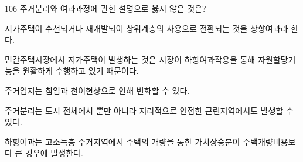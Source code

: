 \begin{question}{106}
주거분리와 여과과정에 관한 설명으로 옳지 않은 것은?
\begin{choices}
  \item 저가주택이 수선되거나 재개발되어 상위계층의 사용으로 전환되는 것을 상향여과라 한다.
  \item 민간주택시장에서 저가주택이 발생하는 것은 시장이 하향여과작용을 통해 자원할당기능을 원활하게 수행하고 있기 때문이다.
  \item 주거입지는 침입과 천이현상으로 인해 변화할 수 있다.
  \item 주거분리는 도시 전체에서 뿐만 아니라 지리적으로 인접한 근린지역에서도 발생할 수 있다.
  \item 하향여과는 고소득층 주거지역에서 주택의 개량을 통한 가치상승분이 주택개량비용보다 큰 경우에 발생한다.
\end{choices}
\end{question}
